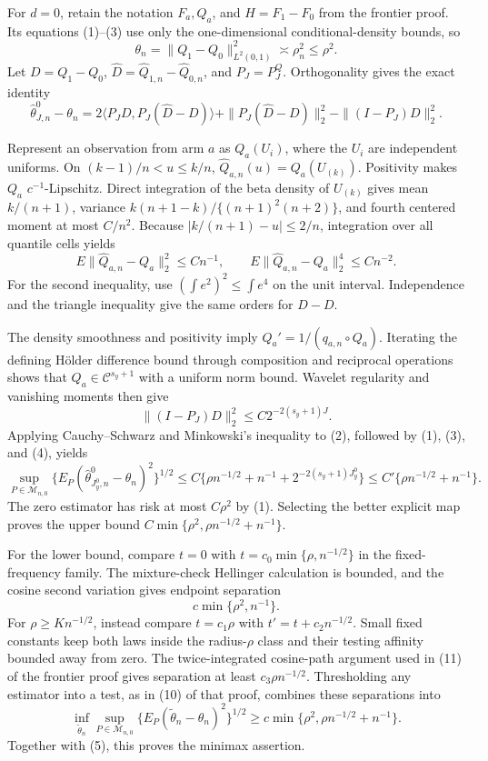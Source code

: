 For \(d=0\), retain the notation \(F_a,Q_a\), and \(H=F_1-F_0\) from the frontier proof.  Its equations (1)--(3) use only the one-dimensional conditional-density bounds, so
\[
\theta_n=\|Q_1-Q_0\|_{L^2(0,1)}^2\asymp\rho_n^2\le\rho^2.                 \tag{1}
\]
Let \(D=Q_1-Q_0\), \(\widehat D=\widehat Q_{1,n}-\widehat Q_{0,n}\), and \(P_J=P^Q_J\).  Orthogonality gives the exact identity
\[
\widehat\theta^0_{J,n}-\theta_n
=2\langle P_JD,P_J(\widehat D-D)\rangle
+\|P_J(\widehat D-D)\|_2^2-\|(I-P_J)D\|_2^2.                             \tag{2}
\]

Represent an observation from arm \(a\) as \(Q_a(U_i)\), where the \(U_i\) are independent uniforms.  On \((k-1)/n<u\le k/n\), \(\widehat Q_{a,n}(u)=Q_a(U_{(k)})\).  Positivity makes \(Q_a\) \(c^{-1}\)-Lipschitz.  Direct integration of the beta density of \(U_{(k)}\) gives mean \(k/(n+1)\), variance \(k(n+1-k)/\{(n+1)^2(n+2)\}\), and fourth centered moment at most \(C/n^2\).  Because \(|k/(n+1)-u|\le2/n\), integration over all quantile cells yields
\[
E\|\widehat Q_{a,n}-Q_a\|_2^2\le Cn^{-1},
\qquad
E\|\widehat Q_{a,n}-Q_a\|_2^4\le Cn^{-2}.                                \tag{3}
\]
For the second inequality, use \((\int e^2)^2\le\int e^4\) on the unit interval.  Independence and the triangle inequality give the same orders for \(\widehat D-D\).

The density smoothness and positivity imply \(Q_a'=1/(q_{a,n}\circ Q_a)\).  Iterating the defining H\"older difference bound through composition and reciprocal operations shows that \(Q_a\in\mathcal C^{s_y+1}\) with a uniform norm bound.  Wavelet regularity and vanishing moments then give
\[
\|(I-P_J)D\|_2^2\le C2^{-2(s_y+1)J}.                                     \tag{4}
\]
Applying Cauchy--Schwarz and Minkowski's inequality to (2), followed by (1), (3), and (4), yields
\[
\sup_{P\in\mathcal M_{n,0}}
\{E_P(\widehat\theta^0_{J_y^0,n}-\theta_n)^2\}^{1/2}
\le C\{\rho n^{-1/2}+n^{-1}+2^{-2(s_y+1)J_y^0}\}
\le C'\{\rho n^{-1/2}+n^{-1}\}.                                        \tag{5}
\]
The zero estimator has risk at most \(C\rho^2\) by (1).  Selecting the better explicit map proves the upper bound \(C\min\{\rho^2,\rho n^{-1/2}+n^{-1}\}\).

For the lower bound, compare \(t=0\) with \(t=c_0\min\{\rho,n^{-1/2}\}\) in the fixed-frequency family.  The mixture-check Hellinger calculation is bounded, and the cosine second variation gives endpoint separation
\[
c\min\{\rho^2,n^{-1}\}.                                                  \tag{6}
\]
For \(\rho\ge Kn^{-1/2}\), instead compare \(t=c_1\rho\) with \(t'=t+c_2n^{-1/2}\).  Small fixed constants keep both laws inside the radius-\(\rho\) class and their testing affinity bounded away from zero.  The twice-integrated cosine-path argument used in (11) of the frontier proof gives separation at least \(c_3\rho n^{-1/2}\).  Thresholding any estimator into a test, as in (10) of that proof, combines these separations into
\[
\inf_{\widetilde\theta_n}\sup_{P\in\mathcal M_{n,0}}
\{E_P(\widetilde\theta_n-\theta_n)^2\}^{1/2}
\ge c\min\{\rho^2,\rho n^{-1/2}+n^{-1}\}.                               \tag{7}
\]
Together with (5), this proves the minimax assertion.

